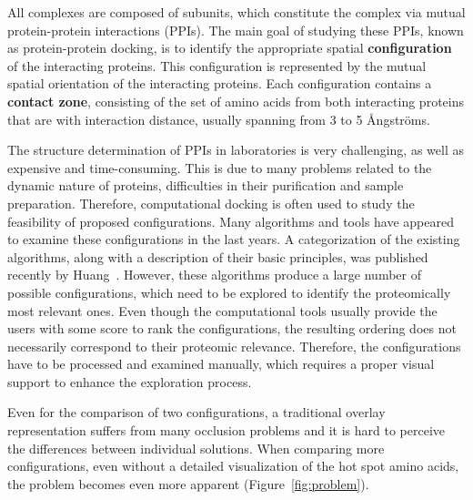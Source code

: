 \documentclass{bmcart}
\begin{document}
All complexes are composed of subunits, which constitute the complex via mutual protein-protein interactions (PPIs).
The main goal of studying these PPIs, known as protein-protein docking, is to identify the appropriate spatial \textbf{configuration} of the interacting proteins.
This configuration is represented by the mutual spatial orientation of the interacting proteins.
Each configuration contains a \textbf{contact zone}, consisting of the set of amino acids from both interacting proteins that are with interaction distance, usually spanning from 3 to 5 \AA ngstr\"{o}ms.

The structure determination of PPIs in laboratories is very challenging, as well as expensive and time-consuming.
This is due to many problems related to the dynamic nature of proteins, difficulties in their purification and sample preparation.
Therefore, computational docking is often used to study the feasibility of proposed configurations.
Many algorithms and tools have appeared to examine these configurations in the last years.
A categorization of the existing algorithms, along with a description of their basic principles, was published recently by Huang~\cite{Huang2014}.
However, these algorithms produce a large number of possible configurations, which need to be explored to identify the proteomically most relevant ones.
Even though the computational tools usually provide the users with some score to rank the configurations, the resulting ordering does not necessarily correspond to their proteomic relevance.
Therefore, the configurations have to be processed and examined manually, which requires a proper visual support to enhance the exploration process.

Even for the comparison of two configurations, a traditional overlay representation suffers from many occlusion problems and it is hard to perceive the differences between individual solutions.
When comparing more configurations, even without a detailed visualization of the hot spot amino acids, the problem becomes even more apparent (Figure~\ref{fig:problem}).
\end{document}
